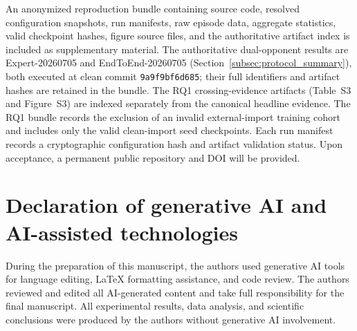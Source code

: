 \documentclass[5p,times]{elsarticle} %
\begin{document}
An anonymized reproduction bundle containing source code, resolved configuration snapshots, run manifests, raw episode data, aggregate statistics, valid checkpoint hashes, figure source files, and the authoritative artifact index is included as supplementary material. The authoritative dual-opponent results are Expert-20260705 and EndToEnd-20260705 (Section~\ref{subsec:protocol_summary}), both executed at clean commit \texttt{9a9f9bf6d685}; their full identifiers and artifact hashes are retained in the bundle. The RQ1 crossing-evidence artifacts (Table~S3 and Figure~S3) are indexed separately from the canonical headline evidence. The RQ1 bundle records the exclusion of an invalid external-import training cohort and includes only the valid clean-import seed checkpoints. Each run manifest records a cryptographic configuration hash and artifact validation status. Upon acceptance, a permanent public repository and DOI will be provided.

\section*{Declaration of generative AI and AI-assisted technologies}
\label{sec:ai}

During the preparation of this manuscript, the authors used generative AI tools for language editing, LaTeX formatting assistance, and code review. The authors reviewed and edited all AI-generated content and take full responsibility for the final manuscript. All experimental results, data analysis, and scientific conclusions were produced by the authors without generative AI involvement.
\end{document}
